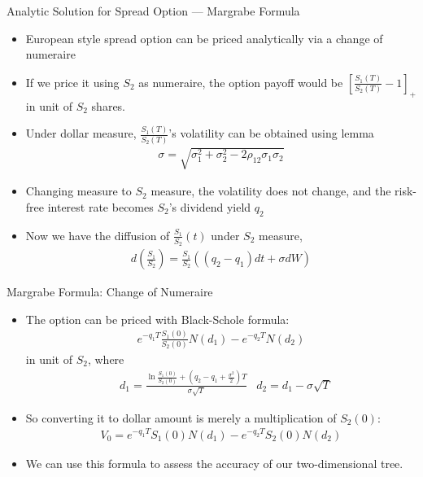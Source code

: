 \begin{frame}{Analytic Solution for Spread Option --- Margrabe Formula}
\begin{itemize}
\item European style spread option can be priced analytically via a change of numeraire
\item If we price it using $S_2$ as numeraire, the option payoff would be $[\frac{S_1(T)}{S_2(T)} - 1]_+$ in unit of $S_2$ shares.
\item Under dollar measure, $\frac{S_1(T)}{S_2(T)}$'s volatility can be obtained using \Ito lemma
\begin{align*}
\sigma = \sqrt{\sigma_1^2 + \sigma_2^2 - 2\rho_{12}\sigma_1 \sigma_2}
\end{align*}
\item Changing measure to $S_2$ measure, the volatility does not change, and the risk-free interest rate becomes $S_2$'s dividend yield $q_2$
\item Now we have the diffusion of $\frac{S_1}{S_2}(t)$ under $S_2$ measure,
\begin{align}
d\left(\frac{S_1}{S_2}\right) = \frac{S_1}{S_2} ((q_2-q_1) dt + \sigma dW)
\end{align}
\end{itemize}
\end{frame}

\begin{frame}{Margrabe Formula: Change of Numeraire}
\begin{itemize}
\item The option can be priced with Black-Schole formula:
\begin{align}
e^{-q_1T} \frac{S_1(0)}{S_2(0)} N(d_1) - e^{-q_2T} N(d_2)
\end{align}
in unit of $S_2$, where
\begin{align}
& d_1 = \frac{\ln \frac{S_1(0)}{S_2(0)} + (q_2 - q_1 + \frac{\sigma^2}{2})T}{\sigma \sqrt{T}}
& d_2 = d_1 - \sigma\sqrt T
\end{align}
\item So converting it to dollar amount is merely a multiplication of $S_2(0)$:
\begin{align}
V_0 = e^{-q_1T} S_1(0) N(d_1) - e^{-q_2T} S_2(0) N(d_2)
\end{align}
\item We can use this formula to assess the accuracy of our two-dimensional tree.
\end{itemize}
\end{frame}



